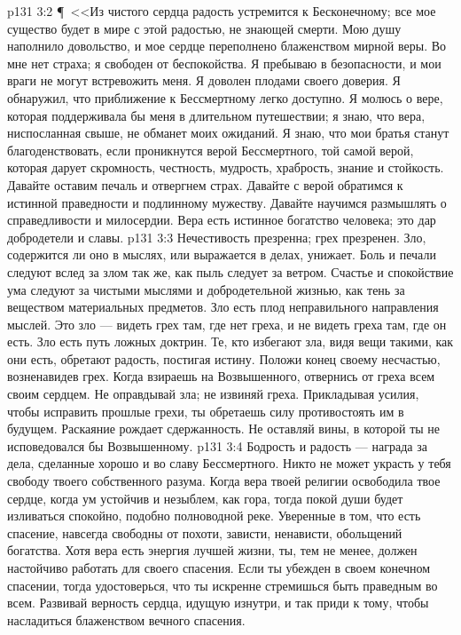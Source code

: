 \vs p131 3:2 \P\ <<Из чистого сердца радость устремится к Бесконечному; все мое существо будет в мире с этой радостью, не знающей смерти. Мою душу наполнило довольство, и мое сердце переполнено блаженством мирной веры. Во мне нет страха; я свободен от беспокойства. Я пребываю в безопасности, и мои враги не могут встревожить меня. Я доволен плодами своего доверия. Я обнаружил, что приближение к Бессмертному легко доступно. Я молюсь о вере, которая поддерживала бы меня в длительном путешествии; я знаю, что вера, ниспосланная свыше, не обманет моих ожиданий. Я знаю, что мои братья станут благоденствовать, если проникнутся верой Бессмертного, той самой верой, которая дарует скромность, честность, мудрость, храбрость, знание и стойкость. Давайте оставим печаль и отвергнем страх. Давайте с верой обратимся к истинной праведности и подлинному мужеству. Давайте научимся размышлять о справедливости и милосердии. Вера есть истинное богатство человека; это дар добродетели и славы.
\vs p131 3:3 Нечестивость презренна; грех презренен. Зло, содержится ли оно в мыслях, или выражается в делах, унижает. Боль и печали следуют вслед за злом так же, как пыль следует за ветром. Счастье и спокойствие ума следуют за чистыми мыслями и добродетельной жизнью, как тень за веществом материальных предметов. Зло есть плод неправильного направления мыслей. Это зло --- видеть грех там, где нет греха, и не видеть греха там, где он есть. Зло есть путь ложных доктрин. Те, кто избегают зла, видя вещи такими, как они есть, обретают радость, постигая истину. Положи конец своему несчастью, возненавидев грех. Когда взираешь на Возвышенного, отвернись от греха всем своим сердцем. Не оправдывай зла; не извиняй греха. Прикладывая усилия, чтобы исправить прошлые грехи, ты обретаешь силу противостоять им в будущем. Раскаяние рождает сдержанность. Не оставляй вины, в которой ты не исповедовался бы Возвышенному.
\vs p131 3:4 Бодрость и радость --- награда за дела, сделанные хорошо и во славу Бессмертного. Никто не может украсть у тебя свободу твоего собственного разума. Когда вера твоей религии освободила твое сердце, когда ум устойчив и незыблем, как гора, тогда покой души будет изливаться спокойно, подобно полноводной реке. Уверенные в том, что есть спасение, навсегда свободны от похоти, зависти, ненависти, обольщений богатства. Хотя вера есть энергия лучшей жизни, ты, тем не менее, должен настойчиво работать для своего спасения. Если ты убежден в своем конечном спасении, тогда удостоверься, что ты искренне стремишься быть праведным во всем. Развивай верность сердца, идущую изнутри, и так приди к тому, чтобы насладиться блаженством вечного спасения.

